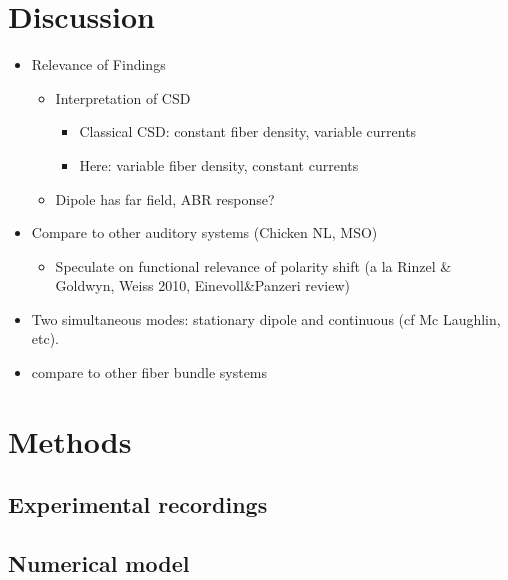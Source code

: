 \documentclass[]{article}
\providecommand{\tightlist}{%
  \setlength{\itemsep}{0pt}\setlength{\parskip}{0pt}}
\begin{document}
\section{Discussion}\label{discussion}

\begin{itemize}
\tightlist
\item
  Relevance of Findings

  \begin{itemize}
  \tightlist
  \item
    Interpretation of CSD

    \begin{itemize}
    \tightlist
    \item
      Classical CSD: constant fiber density, variable currents
    \item
      Here: variable fiber density, constant currents
    \end{itemize}
  \item
    Dipole has far field, ABR response?
  \end{itemize}
\item
  Compare to other auditory systems (Chicken NL, MSO)

  \begin{itemize}
  \tightlist
  \item
    Speculate on functional relevance of polarity shift (a la Rinzel \&
    Goldwyn, Weiss 2010, Einevoll\&Panzeri review)
  \end{itemize}
\item
  Two simultaneous modes: stationary dipole and continuous (cf Mc
  Laughlin, etc).
\item
  compare to other fiber bundle systems
\end{itemize}

\section{Methods}\label{methods}

\subsection{Experimental recordings}\label{experimental-recordings}

\subsection{Numerical model}\label{numerical-model}
\end{document}
